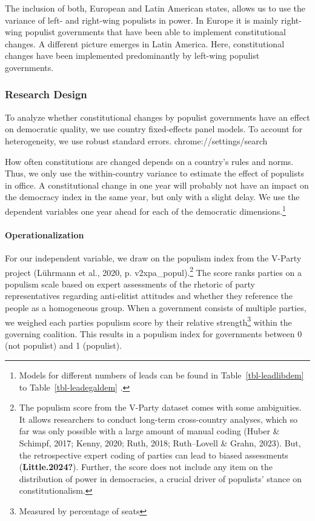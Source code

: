 \documentclass[
  abstract]{article}
\let\oldparagraph\paragraph
\renewcommand{\paragraph}[1]{\oldparagraph{#1}\mbox{}}
\begin{document}
The inclusion of both, European and Latin American states, allows us to
use the variance of left- and right-wing populists in power. In Europe
it is mainly right-wing populist governments that have been able to
implement constitutional changes. A different picture emerges in Latin
America. Here, constitutional changes have been implemented
predominantly by left-wing populist governments.

\hypertarget{research-design}{%
\subsubsection{Research Design}\label{research-design}}

To analyze whether constitutional changes by populist governments have
an effect on democratic quality, we use country fixed-effects panel
models. To account for heterogeneity, we use robust standard errors.
chrome://settings/search

How often constitutions are changed depends on a country's rules and
norms. Thus, we only use the within-country variance to estimate the
effect of populists in office. A constitutional change in one year will
probably not have an impact on the democracy index in the same year, but
only with a slight delay. We use the dependent variables one year ahead
for each of the democratic dimensions.\footnote{Models for different
  numbers of leads can be found in Table~\ref{tbl-leadlibdem} to
  Table~\ref{tbl-leadegaldem} .}

\hypertarget{operationalization}{%
\paragraph{Operationalization}\label{operationalization}}

For our independent variable, we draw on the populism index from the
V-Party project (Lührmann et al., 2020, p. v2xpa\_popul).\footnote{The
  populism score from the V-Party dataset comes with some ambiguities.
  It allows researchers to conduct long-term cross-country analyses,
  which so far was only possible with a large amount of manual coding
  (Huber \& Schimpf, 2017; Kenny, 2020; Ruth, 2018; Ruth--Lovell \&
  Grahn, 2023). But, the retrospective expert coding of parties can lead
  to biased assessments (\textbf{Little.2024?}). Further, the score does
  not include any item on the distribution of power in democracies, a
  crucial driver of populists' stance on constitutionalism.} The score
ranks parties on a populism scale based on expert assessments of the
rhetoric of party representatives regarding anti-elitist attitudes and
whether they reference the people as a homogeneous group. When a
government consists of multiple parties, we weighed each parties
populism score by their relative strength\footnote{Measured by
  percentage of seats} within the governing coalition. This results in a
populism index for governments between 0 (not populist) and 1
(populist).
\end{document}
